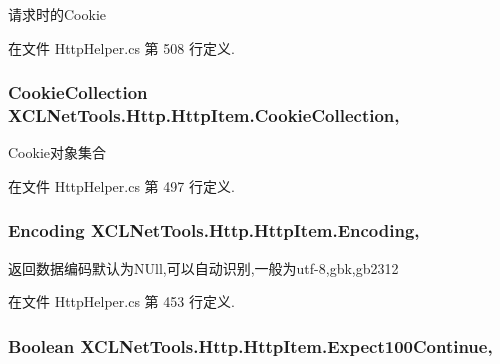 请求时的\-Cookie 



在文件 Http\-Helper.\-cs 第 508 行定义.

\hypertarget{class_x_c_l_net_tools_1_1_http_1_1_http_item_aa6eccba1583250b9a4ff6b18646bd8a6}{
\subsubsection[{Cookie\-Collection}]{\setlength{\rightskip}{0pt plus 5cm}Cookie\-Collection X\-C\-L\-Net\-Tools.\-Http.\-Http\-Item.\-Cookie\-Collection\hspace{0.3cm}{\ttfamily [get]}, {\ttfamily [set]}}}\label{class_x_c_l_net_tools_1_1_http_1_1_http_item_aa6eccba1583250b9a4ff6b18646bd8a6}


Cookie对象集合 



在文件 Http\-Helper.\-cs 第 497 行定义.

\hypertarget{class_x_c_l_net_tools_1_1_http_1_1_http_item_aa3c95b011d9366a1de9f897603b71b93}{
\subsubsection[{Encoding}]{\setlength{\rightskip}{0pt plus 5cm}Encoding X\-C\-L\-Net\-Tools.\-Http.\-Http\-Item.\-Encoding\hspace{0.3cm}{\ttfamily [get]}, {\ttfamily [set]}}}\label{class_x_c_l_net_tools_1_1_http_1_1_http_item_aa3c95b011d9366a1de9f897603b71b93}


返回数据编码默认为\-N\-Ull,可以自动识别,一般为utf-\/8,gbk,gb2312 



在文件 Http\-Helper.\-cs 第 453 行定义.

\hypertarget{class_x_c_l_net_tools_1_1_http_1_1_http_item_a8e4c64cbf9ef46d8734104478b357322}{
\subsubsection[{Expect100\-Continue}]{\setlength{\rightskip}{0pt plus 5cm}Boolean X\-C\-L\-Net\-Tools.\-Http.\-Http\-Item.\-Expect100\-Continue\hspace{0.3cm}{\ttfamily [get]}, {\ttfamily [set]}}}\label{class_x_c_l_net_tools_1_1_http_1_1_http_item_a8e4c64cbf9ef46d8734104478b357322}



